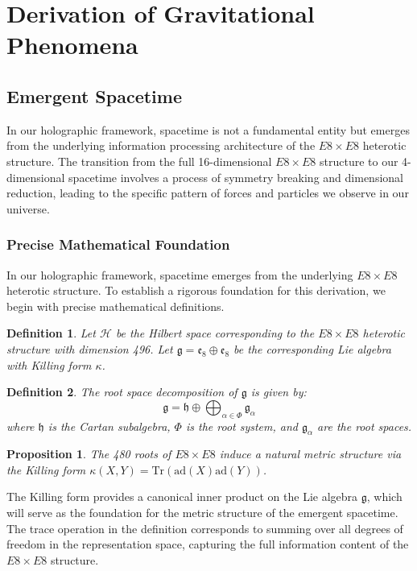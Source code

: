 \documentclass[11pt,english,twoside]{article}
\newtheorem{definition}{Definition}
\newtheorem{proposition}{Proposition}
\begin{document}
\section{Derivation of Gravitational Phenomena}

\subsection{Emergent Spacetime}

In our holographic framework, spacetime is not a fundamental entity but emerges from the underlying information processing architecture of the $E8\times E8$ heterotic structure. The transition from the full 16-dimensional $E8\times E8$ structure to our 4-dimensional spacetime involves a process of symmetry breaking and dimensional reduction, leading to the specific pattern of forces and particles we observe in our universe.

\subsubsection{Precise Mathematical Foundation}

In our holographic framework, spacetime emerges from the underlying $E8\times E8$ heterotic structure. To establish a rigorous foundation for this derivation, we begin with precise mathematical definitions.

\begin{definition}
Let $\mathcal{H}$ be the Hilbert space corresponding to the $E8\times E8$ heterotic structure with dimension 496. Let $\mathfrak{g} = \mathfrak{e}_8 \oplus \mathfrak{e}_8$ be the corresponding Lie algebra with Killing form $\kappa$.
\end{definition}

\begin{definition}
The root space decomposition of $\mathfrak{g}$ is given by:
$$\mathfrak{g} = \mathfrak{h} \oplus \bigoplus_{\alpha \in \Phi} \mathfrak{g}_{\alpha}$$
where $\mathfrak{h}$ is the Cartan subalgebra, $\Phi$ is the root system, and $\mathfrak{g}_{\alpha}$ are the root spaces.
\end{definition}

\begin{proposition}
The 480 roots of $E8\times E8$ induce a natural metric structure via the Killing form $\kappa(X,Y) = \textrm{Tr}(\textrm{ad}(X)\textrm{ad}(Y))$.
\end{proposition}

The Killing form provides a canonical inner product on the Lie algebra $\mathfrak{g}$, which will serve as the foundation for the metric structure of the emergent spacetime. The trace operation in the definition corresponds to summing over all degrees of freedom in the representation space, capturing the full information content of the $E8\times E8$ structure.
\end{document}
